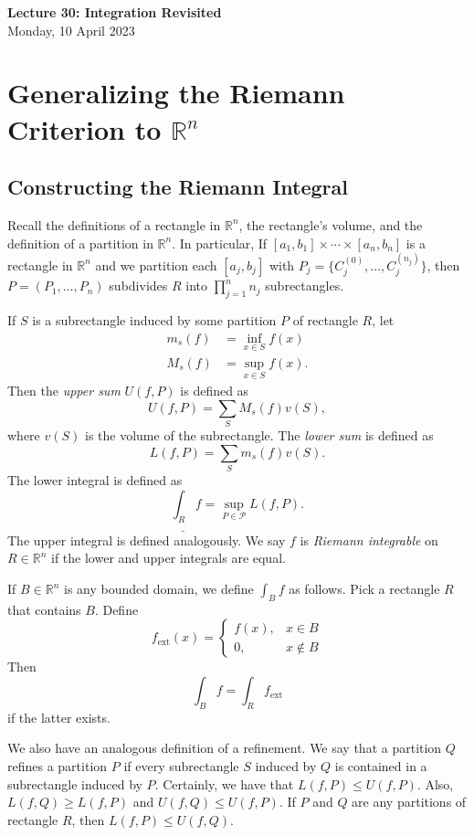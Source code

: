 \documentclass[11pt]{article}
\theoremstyle{definition}
\newcommand{\R}{\mathbb{R}}                      %
\begin{document}
\thispagestyle{empty}

\begin{center}
{\LARGE \bf Lecture 30: Integration Revisited}\\
{\large Monday, 10 April 2023}\\
\end{center}
\section{Generalizing the Riemann Criterion to $\R^n$}


\subsection{Constructing the Riemann Integral}
Recall the definitions of a rectangle in $\R^n$, the rectangle's volume, and the definition of a partition in $\R^n$. In particular, If $[a_1,b_1]\times\cdots\times [a_n,b_n]$ is a rectangle in $\R^n$ and we partition each $[a_j,b_j]$ with $P_j=\{C_j^{(0)},\dots, C_j^{(n_j)}\}$, then $P=(P_1,\dots,P_n)$ subdivides $R$ into $\prod_{j=1}^n n_j$ subrectangles. 

If $S$ is a subrectangle induced by some partition $P$ of rectangle $R$, let
$$
\begin{aligned}
    m_s(f)&=\inf_{x\in S} f(x)\\
    M_s(f)&=\sup_{x\in S}f(x).
\end{aligned}
$$
Then the \textit{upper sum} $U(f,P)$ is defined as
$$
U(f,P)=\sum_S M_s(f)v(S),
$$
where $v(S)$ is the volume of the subrectangle. The \textit{lower sum} is defined as
$$
L(f,P)=\sum_S m_s(f)v(S).
$$
The lower integral is defined as
$$
\underline{\int_{R}}f=\sup_{P\in\mathcal{P}}L(f,P).
$$
The upper integral is defined analogously. We say $f$ is \textit{Riemann integrable} on $R\in\R^n$ if the lower and upper integrals are equal.

If $B\in\R^n$ is any bounded domain, we define $\int_B f$ as follows. Pick a rectangle $R$ that contains $B$. Define 
$$
f_\mathrm{ext}(x)=\begin{cases}
f(x), &x\in B\\
0, &x\notin B
\end{cases}
$$
Then 
$$
\int_B f=\int_R f_\mathrm{ext}
$$
if the latter exists.


We also have an analogous definition of a refinement. We say that a partition $Q$ refines a partition $P$ if every subrectangle $S$ induced by $Q$ is contained in a subrectangle induced by $P$. Certainly, we have that $L(f,P)\leq U(f,P)$. Also, $L(f,Q)\geq L(f,P)$ and $U(f,Q)\leq U(f,P)$. If $P$ and $Q$ are any partitions of rectangle $R$, then $L(f,P)\leq U(f,Q)$.
\end{document}
